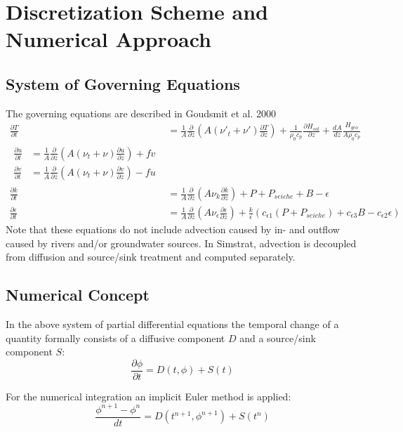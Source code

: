 \documentclass[paper=a4, fontsize=12pt]{article}
\begin{document}
\section{Discretization Scheme and Numerical Approach}
\subsection{System of Governing Equations}
The governing equations are described in Goudsmit et al. 2000
\begin{align}
	\frac{\partial T}{\partial t} &= \frac{1}{A}\frac{\partial}{\partial z}\left(A(\nu'_t + \nu')\frac{\partial T}{\partial z}\right)+\frac{1}{\rho_0 c_p}\frac{\partial H_{sol}}{\partial z}+\frac{dA}{dz}\frac{H_{geo}}{A\rho_0 c_p}\\
	\begin{split}
		\frac{\partial u}{\partial t} &= \frac{1}{A}\frac{\partial}{\partial z}\left(A(\nu_t + \nu)\frac{\partial u}{\partial z}\right) + fv\\
		\frac{\partial v}{\partial t} &= \frac{1}{A}\frac{\partial}{\partial z}\left(A(\nu_t + \nu)\frac{\partial v}{\partial z}\right) - fu
	\end{split}\\
	\frac{\partial k}{\partial t} &= \frac{1}{A}\frac{\partial}{\partial z}\left(A\nu_k\frac{\partial k}{\partial z}\right) + P + P_{seiche} + B - \epsilon\\
	\frac{\partial \epsilon}{\partial t} &= \frac{1}{A}\frac{\partial}{\partial z}\left(A\nu_{\epsilon}\frac{\partial \epsilon}{\partial z}\right) + \frac{k}{\epsilon}\left(c_{\epsilon 1}\left(P+P_{seiche}\right)+c_{\epsilon 3}B-c_{\epsilon 2}\epsilon\right)
\end{align}
Note that these equations do not include advection caused by in- and outflow caused by rivers and/or groundwater sources. In Simstrat, advection is decoupled from diffusion and source/sink treatment and computed separately.

\subsection{Numerical Concept}
In the above system of partial differential equations the temporal change of a quantity formally consists of a diffusive component $D$ and a source/sink component $S$:
\begin{equation}
	\frac{\partial\phi}{\partial t} = D(t, \phi) + S(t)
\end{equation}

\noindent For the numerical integration an implicit Euler method is applied:
\begin{equation}
	\frac{\phi^{n+1}-\phi^n}{dt} = D(t^{n+1}, \phi^{n+1}) + S(t^{n}) 
\end{equation}
\end{document}
